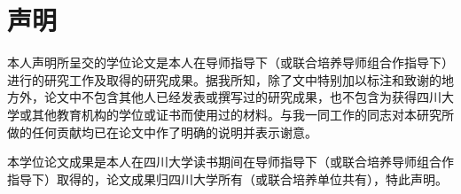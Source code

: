 
\chapter*{声\hspace{1em}明}
\thispagestyle{empty}
本人声明所呈交的学位论文是本人在导师指导下（或联合培养导师组合作指导下）进行的研究工作及取得的研究成果。据我所知，除了文中特别加以标注和致谢的地方外，论文中不包含其他人已经发表或撰写过的研究成果，也不包含为获得四川大学或其他教育机构的学位或证书而使用过的材料。与我一同工作的同志对本研究所做的任何贡献均已在论文中作了明确的说明并表示谢意。

本学位论文成果是本人在四川大学读书期间在导师指导下（或联合培养导师组合作指导下）取得的，论文成果归四川大学所有（或联合培养单位共有），特此声明。
\vspace{4cm}
\autograph
